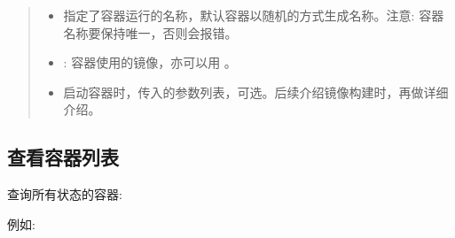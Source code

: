 \documentclass[letterpaper,10pt,english]{sphinxmanual}
\begin{document}
\begin{quote}
\begin{itemize}
\item {} 
指定了容器运行的名称，默认容器以随机的方式生成名称。注意: 容器名称要保持唯一，否则会报错。

\item {} 
: 容器使用的镜像，亦可以用 。

\item {} 
启动容器时，传入的参数列表，可选。后续介绍镜像构建时，再做详细介绍。

\end{itemize}
\end{quote}


\subsection{查看容器列表}
\label{\detokenize{docker/basic_cmd:id13}}
查询所有状态的容器:

\begin{sphinxVerbatim}[commandchars=\\\{\}]
   
\end{sphinxVerbatim}

例如:
\end{document}

